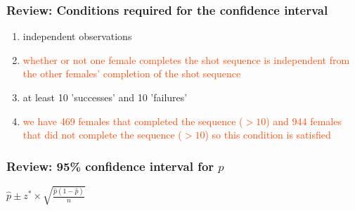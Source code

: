 \begin{frame}
\frametitle{Review: Conditions required for the confidence interval}
\begin{enumerate}
    \item
    independent observations
    \item[]
    \textcolor{OrangeRed}{whether or not one female completes the shot sequence is independent from the other females' completion of the shot sequence}
    \item
    at least 10 'successes' and 10 'failures'
    \item[]
    \textcolor{OrangeRed}{we have 469 females that completed the sequence ($>10$) and 944 females that did not complete the sequence ($>10$) so this condition is satisfied}
\end{enumerate}
\end{frame}


\begin{frame}
\frametitle{Review: 95\% confidence interval for $p$}
\begin{center}
$\displaystyle \hat{p} \pm z^{*} \times \sqrt{\frac{\hat{p}(1-\hat{p})}{n}}$
\end{center}
\end{frame}

